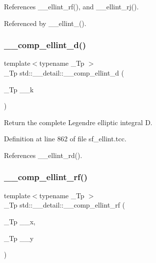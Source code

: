 References \+\_\+\+\_\+ellint\+\_\+rf(), and \+\_\+\+\_\+ellint\+\_\+rj().



Referenced by \+\_\+\+\_\+ellint\+\_().

\mbox{\label{namespacestd_1_1____detail_add5220a1ab03915e4a45dc547bb8eef6}} 
\subsubsection{\texorpdfstring{\+\_\+\+\_\+comp\+\_\+ellint\+\_\+d()}{\_\_comp\_ellint\_d()}}
{\footnotesize\ttfamily template$<$typename \+\_\+\+Tp $>$ \\
\+\_\+\+Tp std\+::\+\_\+\+\_\+detail\+::\+\_\+\+\_\+comp\+\_\+ellint\+\_\+d (\begin{DoxyParamCaption}\item[{\+\_\+\+Tp}]{\+\_\+\+\_\+k }\end{DoxyParamCaption})}

Return the complete Legendre elliptic integral D. 

Definition at line 862 of file sf\+\_\+ellint.\+tcc.



References \+\_\+\+\_\+ellint\+\_\+rd().

\mbox{\label{namespacestd_1_1____detail_a41ecec8820344d3575b464ecd4db5171}} 
\subsubsection{\texorpdfstring{\+\_\+\+\_\+comp\+\_\+ellint\+\_\+rf()}{\_\_comp\_ellint\_rf()}}
{\footnotesize\ttfamily template$<$typename \+\_\+\+Tp $>$ \\
\+\_\+\+Tp std\+::\+\_\+\+\_\+detail\+::\+\_\+\+\_\+comp\+\_\+ellint\+\_\+rf (\begin{DoxyParamCaption}\item[{\+\_\+\+Tp}]{\+\_\+\+\_\+x,  }\item[{\+\_\+\+Tp}]{\+\_\+\+\_\+y }\end{DoxyParamCaption})}



